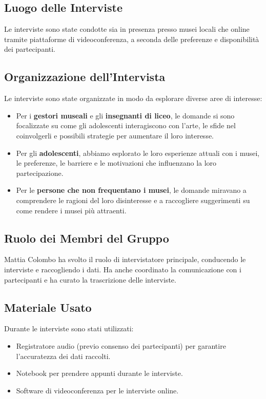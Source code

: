 \documentclass{article}
\begin{document}
\subsection{Luogo delle Interviste}

Le interviste sono state condotte sia in presenza presso musei locali che online tramite piattaforme di videoconferenza, a seconda delle preferenze e disponibilità dei partecipanti.

\subsection{Organizzazione dell'Intervista}

Le interviste sono state organizzate in modo da esplorare diverse aree di interesse:

\begin{itemize}
    \item Per i \textbf{gestori museali} e gli \textbf{insegnanti di liceo}, le domande si sono focalizzate su come gli adolescenti interagiscono con l'arte, le sfide nel coinvolgerli e possibili strategie per aumentare il loro interesse.
    \item Per gli \textbf{adolescenti}, abbiamo esplorato le loro esperienze attuali con i musei, le preferenze, le barriere e le motivazioni che influenzano la loro partecipazione.
    \item Per le \textbf{persone che non frequentano i musei}, le domande miravano a comprendere le ragioni del loro disinteresse e a raccogliere suggerimenti su come rendere i musei più attraenti.
\end{itemize}

\subsection{Ruolo dei Membri del Gruppo}

Mattia Colombo ha svolto il ruolo di intervistatore principale, conducendo le interviste e raccogliendo i dati. Ha anche coordinato la comunicazione con i partecipanti e ha curato la trascrizione delle interviste.

\subsection{Materiale Usato}

Durante le interviste sono stati utilizzati:

\begin{itemize}
    \item Registratore audio (previo consenso dei partecipanti) per garantire l'accuratezza dei dati raccolti.
    \item Notebook per prendere appunti durante le interviste.
    \item Software di videoconferenza per le interviste online.
\end{itemize}
\end{document}
